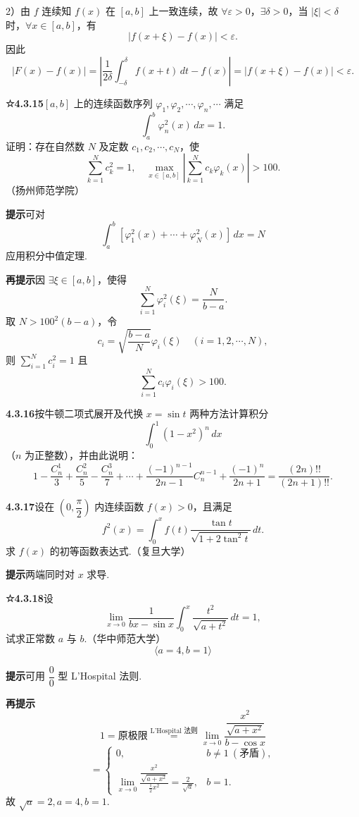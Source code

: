 \documentclass[UTF8, 12pt, fontset=fandol, oneside]{ctexart}
\begin{document}
2）由 $f$ 连续知 $f(x)$ 在 $[a,b]$ 上一致连续，故 $\forall\varepsilon>0$，$\exists\delta>0$，当 $|\xi|<\delta$ 时，$\forall x\in[a,b]$，有
\[
|f(x+\xi)-f(x)|<\varepsilon.
\]
因此
\[
|F(x)-f(x)|
=\left|\frac1{2\delta}\int_{-\delta}^{\delta}f(x+t)\,dt-f(x)\right|
=|f(x+\xi)-f(x)|<\varepsilon.
\]

\noindent\textbf{☆4.3.15}\quad $[a,b]$ 上的连续函数序列 $\varphi_1,\varphi_2,\cdots,\varphi_n,\cdots$ 满足
\[
\int_a^b\varphi_n^2(x)\,dx=1.
\]
证明：存在自然数 $N$ 及定数 $c_1,c_2,\cdots,c_N$，使
\[
\sum_{k=1}^N c_k^2=1,\quad
\max_{x\in[a,b]}\left|\sum_{k=1}^N c_k\varphi_k(x)\right|>100.
\]
（扬州师范学院）

\noindent\textbf{提示}\quad 可对
\[
\int_a^b[\varphi_1^2(x)+\cdots+\varphi_N^2(x)]\,dx=N
\]
应用积分中值定理.

\noindent\textbf{再提示}\quad 因 $\exists\xi\in[a,b]$，使得
\[
\sum_{i=1}^N\varphi_i^2(\xi)=\frac N{b-a}.
\]
取 $N>100^2(b-a)$，令
\[
c_i=\sqrt{\frac{b-a}{N}}\varphi_i(\xi)\quad(i=1,2,\cdots,N),
\]
则 $\sum_{i=1}^N c_i^2=1$ 且
\[
\sum_{i=1}^N c_i\varphi_i(\xi)>100.
\]

\noindent\textbf{4.3.16}\quad 按牛顿二项式展开及代换 $x=\sin t$ 两种方法计算积分
\[
\int_0^1(1-x^2)^n\,dx
\]
（$n$ 为正整数），并由此说明：
\[
1-\frac{C_n^1}{3}+\frac{C_n^2}{5}-\frac{C_n^3}{7}+\cdots
+\frac{(-1)^{n-1}}{2n-1}C_n^{n-1}+\frac{(-1)^n}{2n+1}
=\frac{(2n)!!}{(2n+1)!!}.
\]

\noindent\textbf{4.3.17}\quad 设在 $\left(0,\dfrac\pi2\right)$ 内连续函数 $f(x)>0$，且满足
\[
f^2(x)=\int_0^x f(t)\frac{\tan t}{\sqrt{1+2\tan^2t}}\,dt.
\]
求 $f(x)$ 的初等函数表达式.（复旦大学）

\noindent\textbf{提示}\quad 两端同时对 $x$ 求导.

\noindent\textbf{☆4.3.18}\quad 设
\[
\lim_{x\to0}\frac1{bx-\sin x}\int_0^x\frac{t^2}{\sqrt{a+t^2}}\,dt=1,
\]
试求正常数 $a$ 与 $b$.（华中师范大学）
\[
\langle a=4,b=1\rangle
\]

\noindent\textbf{提示}\quad 可用 $\dfrac00$ 型 L'Hospital 法则.

\noindent\textbf{再提示}\quad
\[
1=\text{原极限}\stackrel{\text{L'Hospital 法则}}{=}
\lim_{x\to0}\frac{\dfrac{x^2}{\sqrt{a+x^2}}}{b-\cos x}
\]
\[
=\begin{cases}
0,&b\ne1\ (\text{矛盾}),\\[0.4em]
\displaystyle\lim_{x\to0}\frac{\dfrac{x^2}{\sqrt{a+x^2}}}{\frac12x^2}
=\frac2{\sqrt a},&b=1.
\end{cases}
\]
故 $\sqrt a=2,a=4,b=1$.
\end{document}
